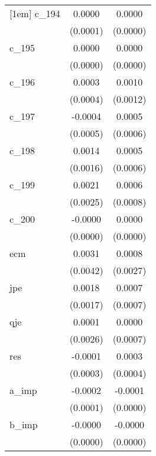 {\begin{tabular}{l*{2}{c}}
[1em]
c\_194       &      0.0000        &      0.0000        \\
            &    (0.0001)        &    (0.0000)        \\
[1em]
c\_195       &      0.0000        &      0.0000        \\
            &    (0.0000)        &    (0.0000)        \\
[1em]
c\_196       &      0.0003        &      0.0010        \\
            &    (0.0004)        &    (0.0012)        \\
[1em]
c\_197       &     -0.0004        &      0.0005        \\
            &    (0.0005)        &    (0.0006)        \\
[1em]
c\_198       &      0.0014        &      0.0005        \\
            &    (0.0016)        &    (0.0006)        \\
[1em]
c\_199       &      0.0021        &      0.0006        \\
            &    (0.0025)        &    (0.0008)        \\
[1em]
c\_200       &     -0.0000        &      0.0000        \\
            &    (0.0000)        &    (0.0000)        \\
[1em]
ecm         &      0.0031        &      0.0008        \\
            &    (0.0042)        &    (0.0027)        \\
[1em]
jpe         &      0.0018        &      0.0007        \\
            &    (0.0017)        &    (0.0007)        \\
[1em]
qje         &      0.0001        &      0.0000        \\
            &    (0.0026)        &    (0.0007)        \\
[1em]
res         &     -0.0001        &      0.0003        \\
            &    (0.0003)        &    (0.0004)        \\
[1em]
a\_imp       &     -0.0002\sym{*} &     -0.0001\sym{**}\\
            &    (0.0001)        &    (0.0000)        \\
[1em]
b\_imp       &     -0.0000\sym{**}&     -0.0000        \\
            &    (0.0000)        &    (0.0000)        \\

\end{tabular}}
